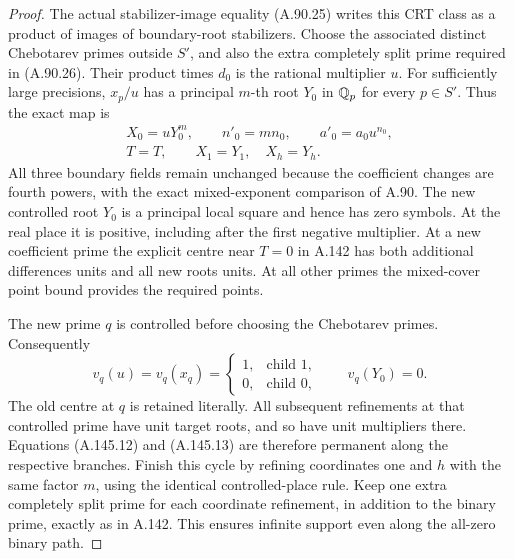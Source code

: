 \begin{proof}
The actual stabilizer-image equality (A.90.25) writes this CRT
class as a product of images of boundary-root stabilizers.
Choose the associated distinct Chebotarev primes outside
\(S'\), and also the extra completely split prime required
in (A.90.26).  Their product times \(d_0\) is the rational
multiplier \(u\).  For sufficiently large precisions,
\(x_p/u\) has a principal \(m\)-th root \(Y_0\) in
\(\mathbb Q_p\) for every \(p\in S'\).  Thus the exact map is
\[
 \begin{gathered}
 X_0=uY_0^m,\qquad n'_0=mn_0,
                \qquad a'_0=a_0u^{n_0},\\
       T=T,
       \qquad X_1=Y_1,\quad X_h=Y_h.
 \end{gathered}
\tag{A.145.15}
\]
All three boundary fields remain unchanged because the
coefficient changes are fourth powers, with the exact
mixed-exponent comparison of A.90.  The new controlled root
\(Y_0\) is a principal local square and hence has zero symbols.
At the real place it is positive, including after the first
negative multiplier.  At a new coefficient prime the explicit
centre near \(T=0\) in A.142 has both additional differences
units and all new roots units.  At all other primes the
mixed-cover point bound provides the required points.

The new prime \(q\) is controlled before choosing the
Chebotarev primes.  Consequently
\[
     v_q(u)=v_q(x_q)=
          \begin{cases}1,&\text{child }1,\\0,&\text{child }0,
          \end{cases}
        \qquad v_q(Y_0)=0.
\tag{A.145.16}
\]
The old centre at \(q\) is retained literally.  All subsequent
refinements at that controlled prime have unit target roots,
and so have unit multipliers there.  Equations (A.145.12)
and (A.145.13) are therefore permanent along the respective
branches.  Finish this cycle by refining coordinates one and
\(h\) with the same factor \(m\), using the identical
controlled-place rule.  Keep one extra completely split prime
for each coordinate refinement, in addition to the binary
prime, exactly as in A.142.  This ensures infinite support even
along the all-zero binary path.


\end{proof}
